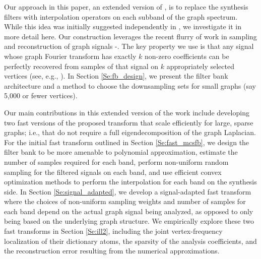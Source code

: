 \documentclass[journal, 10pt]{IEEEtran}
\begin{document}
Our approach in this paper, an extended version of \cite{jin_conf}, is to replace the synthesis filters with interpolation operators on each subband of the graph spectrum. While this idea was initially suggested independently in \cite{chen2015discrete}, we investigate it in more detail here. Our construction leverages the recent flurry of work in sampling and reconstruction of graph signals \cite{chen2015discrete}-\nocite{pesenson_paley,narang2013interpolation,anis2014towards,gadde2015probabilistic,shomorony,PuyTGV15,chen2015signal,tsitsvero2016uncertainty,chen2016signal,anis2016efficient}\cite{di2017sampling}. The key property we use is that any signal whose graph Fourier transform has exactly $k$ non-zero coefficients can be perfectly recovered from samples of that signal on $k$ appropriately selected vertices (see, e.g., \cite[Theorem 1]{chen2015discrete} \cite[Proposition 1]{anis2016efficient}). In Section \ref{Se:fb_design}, we present the filter bank architecture and a method to choose the downsampling sets for small graphs 
(say 5,000 or fewer vertices). 

Our main contributions in this extended version of the work include developing two fast versions of the proposed transform that scale efficiently for large, sparse graphs; i.e., that do not require a full eigendecomposition of the graph Laplacian. For the initial fast transform outlined in Section \ref{Se:fast_mcsfb}, we design the filter bank to be more amenable to polynomial approximation, estimate the number of samples required for each band, perform non-uniform random sampling for the filtered signals on each band, and use efficient convex optimization methods to perform the interpolation for each band on the synthesis side. In Section \ref{Se:signal_adapted}, we develop a signal-adapted fast transform where the choices of non-uniform sampling weights and number of samples for each band depend on the actual graph signal being analyzed, as opposed to only being based on the underlying graph structure. We 
empirically explore these two fast transforms in Section \ref{Se:ill2},  including the joint vertex-frequency localization of their dictionary atoms, the sparsity of the analysis coefficients, and the reconstruction error resulting from the numerical approximations.

\end{document}
